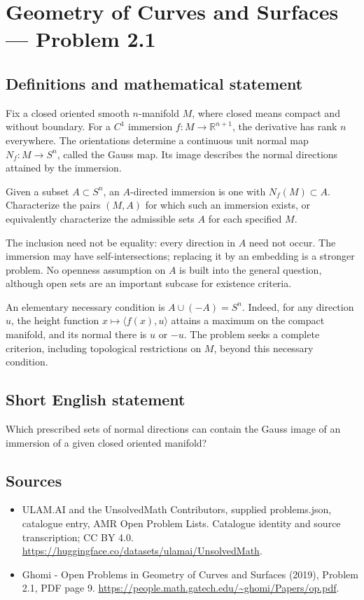\documentclass[11pt,a4paper]{article}
\begin{document}
\section*{Geometry of Curves and Surfaces — Problem 2.1}\label{statement}

\subsection{Definitions and mathematical statement}
Fix a closed oriented smooth $n$-manifold $M$, where closed means
compact and without boundary. For a $C^1$ immersion
$f:M\to\mathbb R^{n+1}$, the derivative has rank $n$ everywhere.
The orientations determine a continuous unit normal map
$N_f:M\to S^n$, called the Gauss map. Its image describes the
normal directions attained by the immersion.

Given a subset $A\subset S^n$, an $A$-directed immersion is one
with $N_f(M)\subset A$. Characterize the pairs $(M,A)$ for which
such an immersion exists, or equivalently characterize the
admissible sets $A$ for each specified $M$.

The inclusion need not be equality: every direction in $A$ need
not occur. The immersion may have self-intersections; replacing
it by an embedding is a stronger problem. No openness assumption
on $A$ is built into the general question, although open sets
are an important subcase for existence criteria.

An elementary necessary condition is $A\cup(-A)=S^n$. Indeed,
for any direction $u$, the height function
$x\mapsto\langle f(x),u\rangle$ attains a maximum on the compact
manifold, and its normal there is $u$ or $-u$. The problem seeks
a complete criterion, including topological restrictions on $M$,
beyond this necessary condition.
\subsection{Short English statement}
Which prescribed sets of normal directions can contain the Gauss
image of an immersion of a given closed oriented manifold?
\subsection{Sources}
\begin{itemize}
\item[S1] ULAM.AI and the UnsolvedMath Contributors, supplied problems.json, catalogue entry, AMR Open Problem Lists. Catalogue identity and source transcription; CC BY 4.0.
\url{https://huggingface.co/datasets/ulamai/UnsolvedMath}.
\item[S2] Ghomi - Open Problems in Geometry of Curves and Surfaces (2019), Problem 2.1, PDF page 9. 
\url{https://people.math.gatech.edu/~ghomi/Papers/op.pdf}.
\end{itemize}
\end{document}
